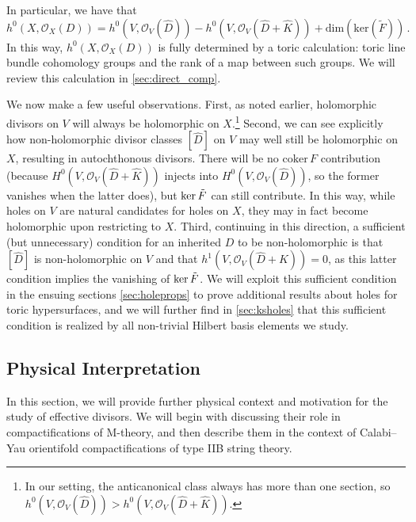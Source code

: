 \documentclass[11pt,dvipsnames]{article}
\theoremstyle{definition}
\begin{document}
In particular, we have that
\begin{equation}
    \label{eq:CY_global_section}
    h^0(X, \mathcal{O}_X(D)) = h^0(V, \mathcal{O}_V(\hat{D})) - h^0(V, \mathcal{O}_V(\hat{D}+\hat{K})) + \mathrm{dim}(\mathrm{ker}(\tilde{F})) \, .
\end{equation}
In this way, $h^0(X, \mathcal{O}_X(D))$ is fully determined by a toric calculation: toric line bundle cohomology groups and the rank of a map between such groups. We will review this calculation in \cref{sec:direct_comp}.

We now make a few useful observations. First, as noted earlier, holomorphic divisors on $V$ will always be holomorphic on $X$.\footnote{In our setting, the anticanonical class always has more than one section, so $h^0(V, \mathcal{O}_V(\hat{D})) > h^0(V, \mathcal{O}_V(\hat{D}+\hat{K}))$.} Second, we can see explicitly how non-holomorphic divisor classes $[\hat{D}]$ on $V$ may well still be holomorphic on $X$, resulting in autochthonous divisors. There will be no $\mathrm{coker} \, F$ contribution (because $H^0(V,\mathcal{O}_V(\hat{D} + \hat{K}))$ injects into $H^0(V,\mathcal{O}_V(\hat{D}))$, so the former vanishes when the latter does), but $\mathrm{ker} \, \Tilde{F}$ can still contribute. In this way, while holes on $V$ are natural candidates for holes on $X$, they may in fact become holomorphic upon restricting to $X$. Third, continuing in this direction, a sufficient (but unnecessary) condition for an inherited $D$ to be non-holomorphic is that $[\hat{D}]$ is non-holomorphic on $V$ and that $h^1(V, \mathcal{O}_V(\hat{D} + K)) = 0$, as this latter condition implies the vanishing of $\mathrm{ker} \, \Tilde{F}$. We will exploit this sufficient condition in the ensuing sections \cref{sec:holeprops} to prove additional results about holes for toric hypersurfaces, and we will further find in \cref{sec:ksholes} that this sufficient condition is realized by all non-trivial Hilbert basis elements we study. 

\subsection{Physical Interpretation}

In this section, we will provide further physical context and motivation for the study of effective divisors. We will begin with discussing their role in compactifications of M-theory, and then describe them in the context of Calabi--Yau orientifold compactifications of type IIB string theory.
\end{document}

